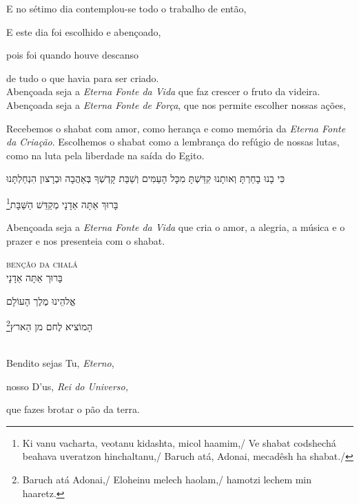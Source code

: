 E no sétimo dia contemplou-se todo o trabalho de \qb{}então,

E este dia foi escolhido e abençoado,

pois foi quando houve descanso

de tudo o que havia para ser criado.\\[10pt]

Abençoada seja a \emph{Eterna Fonte da Vida} que faz crescer \qb{}o fruto da videira.\\[10pt]

Abençoada seja a \emph{Eterna Fonte de Força}, que nos \qb{}permite escolher nossas ações,

Recebemos o shabat com amor, como herança e como memória da \emph{Eterna
Fonte da Criação}. Escolhemos o shabat como a lembrança do refúgio de
nossas lutas, como na luta pela liberdade na saída do Egito.

\movetoevenpage
\raggedleft

כִּי בָנוּ בָחַרְתָּ וְאותָנוּ קִדַּשְׁתָּ מִכָּל הָעַמִּים וְשַׁבַּת
קָדְשְׁךָ בְּאַהֲבָה וּבְרָצון הִנְחַלְתָּנוּ

בָּרוּךְ אַתָּה אַדָנָי מְקַדֵּשׁ הַשַּׁבָּת\footnote{
Ki vanu vacharta, veotanu kidashta, micol haamim,/
Ve shabat codshechá beahava uveratzon hinchaltanu,/
Baruch atá, Adonai, mecadêsh ha shabat./}

\movetooddpage
\raggedright

Abençoada seja a \emph{Eterna Fonte da Vida} que cria o amor, a alegria,
a música e o prazer e nos presenteia com o shabat.

\movetoevenpage
\raggedleft

\textsc{benção da chalá}\\[15pt]

בָּרוּך אַתָּה אַדָנָי

אֱלהֵינוּ מֶלֶך הָעוֹלָם

הָמוֹציא לֶחם מן הַארץ\footnote{Baruch atá Adonai,/ Eloheinu melech haolam,/ hamotzi lechem min haaretz.}

\movetooddpage
\raggedright

\textsc{}\\[15pt]

Bendito sejas Tu, \emph{Eterno},

nosso D'us, \emph{Rei do Universo,}

que fazes brotar o pão da terra.
